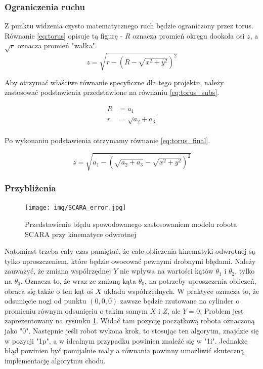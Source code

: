 \subsubsection{Ograniczenia ruchu}
Z punktu widzenia czysto matematycznego ruch będzie ograniczony przez torus. Równanie \ref{eq:torus} opisuje tą figurę - $R$ oznacza promień okręgu dookoła osi $z$, a $\sqrt{r}$ oznacza promień "wałka".\\

\begin{equation} \label{eq:torus}
z = \sqrt{r -(R-\sqrt{x^2+y^2})^2}
\end{equation}

Aby otrzymać właściwe równanie specyficzne dla tego projektu, należy zastosować podstawienia przedstawione na równaniu \ref{eq:torus_subs}. 

\begin{equation} \label{eq:torus_subs}
\begin{split}
R &= a_1\\
r &= \sqrt{a_2 + a_3}\\
\end{split}
\end{equation}

Po wykonaniu podstawienia otrzymamy równanie \ref{eq:torus_final}.

\begin{equation} \label{eq:torus_final}
z = \sqrt{a_1-(\sqrt{a_2 + a_3}-\sqrt{x^2+y^2})^2}
\end{equation}


\subsubsection{Przybliżenia}
\begin{figure}[h!]
\texttt{[image: img/SCARA\_error.jpg]}
\caption{Przedstawienie błędu spowodowanego zastosowaniem modelu robota SCARA przy kinematyce odwrotnej}
\label{SCARA_error}
\end{figure}
Natomiast trzeba cały czas pamiętać, że całe obliczenia kinematyki odwrotnej są tylko uproszczeniem, które będzie owocować pewnymi drobnymi błędami. Należy zauważyć, że zmiana współrzędnej $Y$ nie wpływa na wartości kątów $\theta_1$ i $\theta_2$, tylko na $\theta_0$. Oznacza to, że wraz ze zmianą kąta $\theta_0$, na potrzeby uproszczenia obliczeń, obraca się także o ten kąt oś $X$ układu współrzędnych. W praktyce oznacza to, że odsunięcie nogi od punktu $(0, 0, 0)$ zawsze będzie rzutowane na cylinder o promieniu równym odsunięciu o takim samym $X$ i $Z$, ale $Y = 0$. Problem jest zaprezentowany na rysunku \ref{SCARA_error}. Widać tam pozycję początkową robota oznaczoną jako "0". Następnie jeśli robot wykona krok, to stosując ten algorytm, znajdzie się w pozycji "1p", a w idealnym przypadku powinien znaleźć się w "1i". Jednakże błąd powinien być pomijalnie mały a równania powinny umożliwić skuteczną implementację algorytmu chodu.




